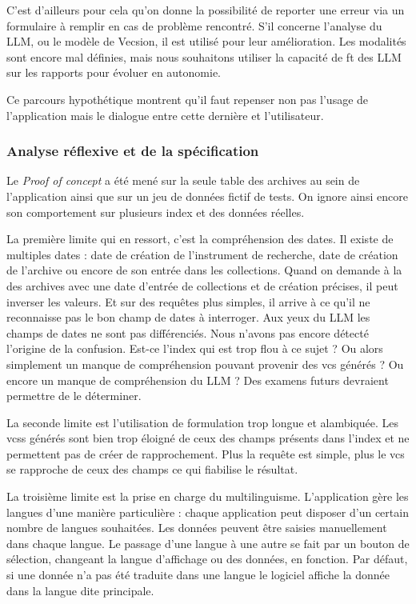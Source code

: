 C'est d'ailleurs pour cela qu'on donne la possibilité de reporter une erreur via un formulaire à remplir en cas de problème rencontré. S'il concerne l'analyse du \gls{LLM}, ou le modèle de \gls{Vecsion}, il est utilisé pour leur amélioration. Les modalités sont encore mal définies, mais nous souhaitons utiliser la capacité de \gls{ft} des \gls{LLM} sur les rapports pour évoluer en autonomie.\newline

Ce parcours hypothétique montrent qu'il faut repenser non pas l'usage de l'application mais le dialogue entre cette dernière et l'utilisateur.

\subsubsection{Analyse réflexive et de la spécification}

Le \textit{Proof of concept} a été mené sur la seule \gls{table} des archives au sein de l'application ainsi que sur un jeu de données fictif de tests. On ignore ainsi encore son comportement sur plusieurs index et des données réelles.\newline

La première limite qui en ressort, c'est la compréhension des dates. Il existe de multiples dates : date de création de l'instrument de recherche, date de création de l'archive ou encore de son entrée dans les collections. Quand on demande à la  des archives avec une date d'entrée de collections et de création précises, il peut inverser les valeurs. Et sur des requêtes plus simples, il arrive à ce qu'il ne reconnaisse pas le bon champ de dates à interroger. Aux yeux du \gls{LLM} les champs de dates ne sont pas différenciés. Nous n'avons pas encore détecté l'origine de la confusion. Est-ce l'index qui est trop flou à ce sujet ? Ou alors simplement un manque de compréhension pouvant provenir des \gls{vcs} générés ? Ou encore un manque de compréhension du \gls{LLM} ? Des examens futurs devraient permettre de le déterminer.

La seconde limite est l'utilisation de formulation trop longue et alambiquée. Les \glspl{vcs} générés sont bien trop éloigné de ceux des champs présents dans l'index et ne permettent pas de créer de rapprochement. Plus la requête est simple, plus le \gls{vcs} se rapproche de ceux des champs ce qui fiabilise le résultat.

La troisième limite est la prise en charge du multilinguisme. L'application gère les langues d'une manière particulière : chaque application peut disposer d'un certain nombre de langues souhaitées. Les données peuvent être saisies manuellement dans chaque langue. Le passage d'une langue à une autre se fait par un bouton de sélection, changeant la langue d'affichage ou des données, en fonction. Par défaut, si une donnée n'a pas été traduite dans une langue le logiciel affiche la donnée dans la langue dite principale. 

